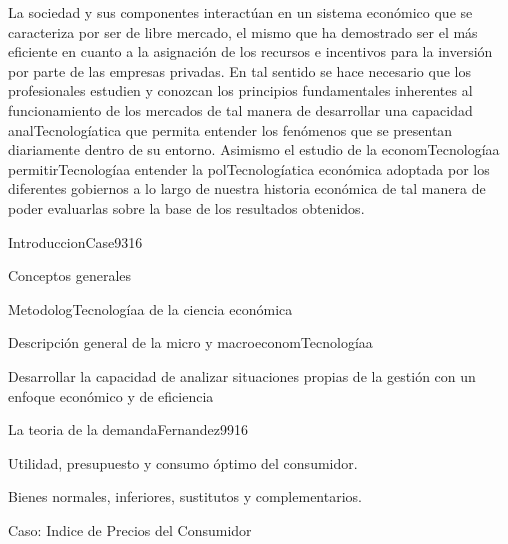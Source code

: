\begin{syllabus}


\begin{justification}
La sociedad y sus componentes interactúan en un sistema económico que se caracteriza por ser de libre mercado, el mismo que ha demostrado ser el más eficiente en cuanto a la asignación de los recursos e incentivos para la inversión por parte de las empresas privadas. En tal sentido se hace necesario que los profesionales estudien y conozcan los principios fundamentales inherentes al funcionamiento de los mercados de tal manera de desarrollar una capacidad analTecnologíatica que permita entender los fenómenos que se presentan diariamente dentro de su entorno. Asimismo el estudio de la economTecnologíaa permitirTecnologíaa entender la polTecnologíatica económica adoptada por los diferentes gobiernos a lo largo de nuestra historia económica de tal manera de poder evaluarlas sobre la base de los resultados obtenidos.
\end{justification}

\begin{goals}
\item \OutcomeHU
\end{goals}

\begin{outcomes}
\end{outcomes}

\begin{unit}{Introduccion}{Case93}{16}
\begin{topics}
	\item Conceptos generales
	\item MetodologTecnologíaa de la ciencia económica
	\item Descripción general de la micro y macroeconomTecnologíaa
\end{topics}

\begin{unitgoals}
      \item Desarrollar la capacidad de analizar situaciones propias de la gestión con un enfoque económico y de eficiencia
   \end{unitgoals}
\end{unit}

\begin{unit}{La teoria de la demanda}{Fernandez99}{16}
\begin{topics}
	\item  Utilidad, presupuesto y consumo óptimo del consumidor.
	\item Bienes normales, inferiores, sustitutos y complementarios.
 	\item Caso: Indice de Precios del Consumidor
\end{topics}


\end{unit}
\end{syllabus}
